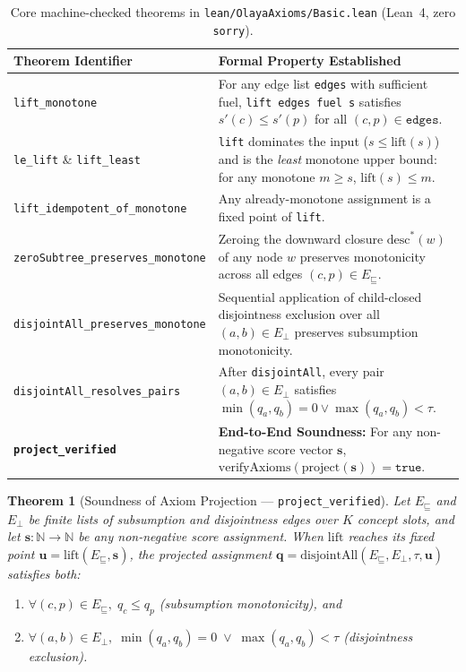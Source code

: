 \documentclass[11pt,a4paper]{article}
\newtheorem{theorem}{Theorem}[section]
\begin{document}
\begin{table}[ht!]
\centering
\caption{Core machine-checked theorems in \texttt{lean/OlayaAxioms/Basic.lean} (Lean~4, zero \texttt{sorry}).}
\label{tab:lean}
\vspace{0.4em}
\small
\begin{tabularx}{\textwidth}{l X}
\toprule
\textbf{Theorem Identifier} & \textbf{Formal Property Established} \\
\midrule
\texttt{lift\_monotone} & For any edge list \texttt{edges} with sufficient fuel, \texttt{lift edges fuel s} satisfies $s'(c) \le s'(p)$ for all $(c, p) \in \texttt{edges}$. \\
\addlinespace[0.25em]
\texttt{le\_lift} \& \texttt{lift\_least} & \texttt{lift} dominates the input ($s \le \mathrm{lift}(s)$) and is the \emph{least} monotone upper bound: for any monotone $m \ge s$, $\mathrm{lift}(s) \le m$. \\
\addlinespace[0.25em]
\texttt{lift\_idempotent\_of\_monotone} & Any already-monotone assignment is a fixed point of \texttt{lift}. \\
\addlinespace[0.25em]
\texttt{zeroSubtree\_preserves\_monotone} & Zeroing the downward closure $\mathrm{desc}^*(w)$ of any node $w$ preserves monotonicity across all edges $(c, p) \in E_{\sqsubseteq}$. \\
\addlinespace[0.25em]
\texttt{disjointAll\_preserves\_monotone} & Sequential application of child-closed disjointness exclusion over all $(a, b) \in E_{\perp}$ preserves subsumption monotonicity. \\
\addlinespace[0.25em]
\texttt{disjointAll\_resolves\_pairs} & After \texttt{disjointAll}, every pair $(a, b) \in E_{\perp}$ satisfies $\min(q_a, q_b) = 0 \lor \max(q_a, q_b) < \tau$. \\
\addlinespace[0.25em]
\textbf{\texttt{project\_verified}} & \textbf{End-to-End Soundness:} For any non-negative score vector $\mathbf{s}$, $\mathrm{verifyAxioms}(\mathrm{project}(\mathbf{s})) = \texttt{true}$. \\
\bottomrule
\end{tabularx}
\end{table}

\begin{theorem}[Soundness of Axiom Projection --- \texttt{project\_verified}]
Let $E_{\sqsubseteq}$ and $E_{\perp}$ be finite lists of subsumption and disjointness edges over $K$ concept slots, and let $\mathbf{s} : \mathbb{N} \to \mathbb{N}$ be any non-negative score assignment. When $\mathrm{lift}$ reaches its fixed point $\mathbf{u} = \mathrm{lift}(E_{\sqsubseteq}, \mathbf{s})$, the projected assignment $\mathbf{q} = \mathrm{disjointAll}(E_{\sqsubseteq}, E_{\perp}, \tau, \mathbf{u})$ satisfies both:
\begin{enumerate}[label=(\roman*),itemsep=0.15em]
  \item $\forall (c, p) \in E_{\sqsubseteq},\; q_c \le q_p$ \quad (subsumption monotonicity), and
  \item $\forall (a, b) \in E_{\perp},\; \min(q_a, q_b) = 0 \;\lor\; \max(q_a, q_b) < \tau$ \quad (disjointness exclusion).
\end{enumerate}
\end{theorem}
\end{document}
